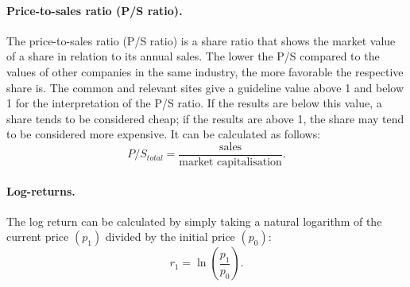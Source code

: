 \paragraph{Price-to-sales ratio (P/S ratio).}
The price-to-sales ratio (P/S ratio) is a share ratio that shows the market value of a
share in relation to its annual sales. The lower the P/S compared to the values of other
companies in the same industry, the more favorable the respective share is. The common
and relevant sites give a guideline value above 1 and below 1 for the interpretation of
the P/S ratio. If the results are below this value, a share tends to be considered cheap;
if the results are above 1, the share may tend to be considered more expensive. It can be
calculated as follows:
\begin{equation}
  P/S_{total} = \frac{\text{sales}}{\text{market capitalisation}}.
\end{equation}

\paragraph{Log-returns.}
The log return can be calculated by simply taking a natural logarithm of the current
price $(p_1)$ divided by the initial price $(p_0)$:
\begin{equation}
  r_1 = \ln\!\left(\frac{p_1}{p_0}\right).
\end{equation}
